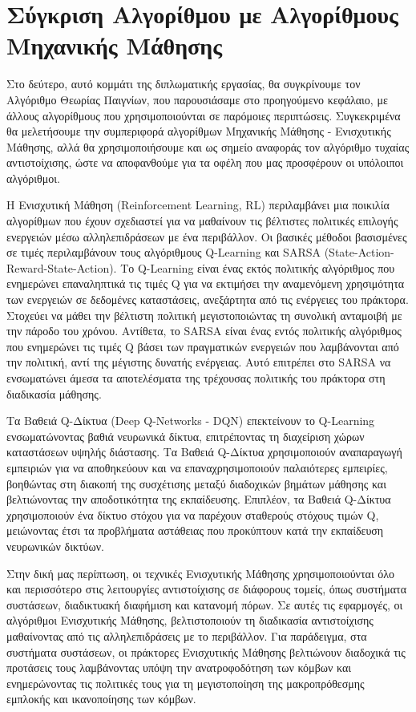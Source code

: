\chapter{Σύγκριση Αλγορίθμου με Αλγορίθμους Μηχανικής Μάθησης}

Στο δεύτερο, αυτό κομμάτι της διπλωματικής εργασίας, θα συγκρίνουμε τον Αλγόριθμο Θεωρίας Παιγνίων, που παρουσιάσαμε στο προηγούμενο κεφάλαιο, με άλλους αλγορίθμους που χρησιμοποιούνται σε παρόμοιες περιπτώσεις. Συγκεκριμένα θα μελετήσουμε την συμπεριφορά αλγορίθμων Μηχανικής Μάθησης - Ενισχυτικής Μάθησης, αλλά θα χρησιμοποιήσουμε και ως σημείο αναφοράς τον αλγόριθμο τυχαίας αντιστοίχισης, ώστε να αποφανθούμε για τα οφέλη που μας προσφέρουν οι υπόλοιποι αλγόριθμοι.

Η Ενισχυτική Μάθηση (Reinforcement Learning, RL) περιλαμβάνει μια ποικιλία αλγορίθμων που έχουν σχεδιαστεί για να μαθαίνουν τις βέλτιστες πολιτικές επιλογής ενεργειών μέσω αλληλεπιδράσεων με ένα περιβάλλον. Οι βασικές μέθοδοι βασισμένες σε τιμές περιλαμβάνουν τους αλγόριθμους Q-Learning και SARSA (State-Action-Reward-State-Action). Το Q-Learning είναι ένας εκτός πολιτικής αλγόριθμος που ενημερώνει επαναληπτικά τις τιμές Q για να εκτιμήσει την αναμενόμενη χρησιμότητα των ενεργειών σε δεδομένες καταστάσεις, ανεξάρτητα από τις ενέργειες του πράκτορα. Στοχεύει να μάθει την βέλτιστη πολιτική μεγιστοποιώντας τη συνολική ανταμοιβή με την πάροδο του χρόνου. Αντίθετα, το SARSA είναι ένας εντός πολιτικής αλγόριθμος που ενημερώνει τις τιμές Q βάσει των πραγματικών ενεργειών που λαμβάνονται από την πολιτική, αντί της μέγιστης δυνατής ενέργειας. Αυτό επιτρέπει στο SARSA να ενσωματώνει άμεσα τα αποτελέσματα της τρέχουσας πολιτικής του πράκτορα στη διαδικασία μάθησης. 

Τα Βαθειά Q-Δίκτυα (Deep Q-Networks - DQN) επεκτείνουν το Q-Learning ενσωματώνοντας βαθιά νευρωνικά δίκτυα, επιτρέποντας τη διαχείριση χώρων καταστάσεων υψηλής διάστασης. Τα Βαθειά Q-Δίκτυα χρησιμοποιούν αναπαραγωγή εμπειριών για να αποθηκεύουν και να επαναχρησιμοποιούν παλαιότερες εμπειρίες, βοηθώντας στη διακοπή της συσχέτισης μεταξύ διαδοχικών βημάτων μάθησης και βελτιώνοντας την αποδοτικότητα της εκπαίδευσης. Επιπλέον, τα Βαθειά Q-Δίκτυα χρησιμοποιούν ένα δίκτυο στόχου για να παρέχουν σταθερούς στόχους τιμών Q, μειώνοντας έτσι τα προβλήματα αστάθειας που προκύπτουν κατά την εκπαίδευση νευρωνικών δικτύων. 

Στην δική μας περίπτωση, οι τεχνικές Ενισχυτικής Μάθησης χρησιμοποιούνται όλο και περισσότερο στις λειτουργίες αντιστοίχισης σε διάφορους τομείς, όπως συστήματα συστάσεων, διαδικτυακή διαφήμιση και κατανομή πόρων. Σε αυτές τις εφαρμογές, οι αλγόριθμοι Ενισχυτικής Μάθησης, βελτιστοποιούν τη διαδικασία αντιστοίχισης μαθαίνοντας από τις αλληλεπιδράσεις με το περιβάλλον. Για παράδειγμα, στα συστήματα συστάσεων, οι πράκτορες Ενισχυτικής Μάθησης βελτιώνουν διαδοχικά τις προτάσεις τους λαμβάνοντας υπόψη την ανατροφοδότηση των κόμβων και ενημερώνοντας τις πολιτικές τους για τη μεγιστοποίηση της μακροπρόθεσμης εμπλοκής και ικανοποίησης των κόμβων. 

